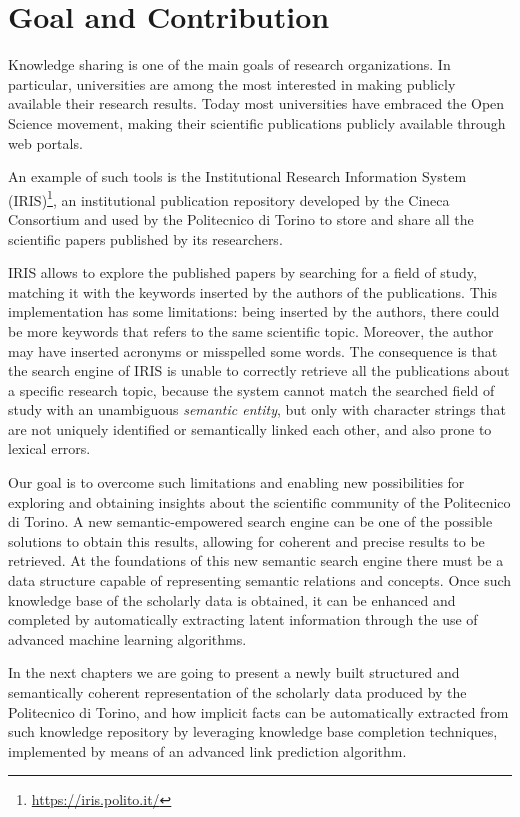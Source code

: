 \documentclass[%
    corpo=13.5pt,
    twoside,
    oldstyle,
    tipotesi=magistrale,
    greek,
    evenboxes
]{toptesi}
\begin{document}
\section{Goal and Contribution}

Knowledge sharing is one of the main goals of research organizations. In
particular, universities are among the most interested in making publicly
available their research results. Today most universities have embraced the Open
Science movement, making their scientific publications publicly available
through web portals.

An example of such tools is the Institutional Research Information
System (IRIS)\footnote{\url{https://iris.polito.it/}}, an
institutional publication repository developed by the Cineca Consortium and
used by the Politecnico di Torino to store and share all the scientific papers
published by its researchers.

IRIS allows to explore the published papers by searching for a field of study,
matching it with the keywords inserted by the authors of the publications.
This implementation has some limitations: being inserted by the authors, there
could be more keywords that refers to the same scientific topic.
Moreover, the author may have inserted acronyms or misspelled some words.
The consequence is that the search engine of IRIS is unable to correctly
retrieve all the publications about a specific research topic, because the
system cannot match the searched field of study with an unambiguous
\emph{semantic entity}, but only with character strings that are not
uniquely identified or semantically linked each other, and also prone to
lexical errors.

Our goal is to overcome such limitations and enabling new possibilities for
exploring and obtaining insights about the scientific community of the
Politecnico di Torino. A new semantic-empowered search engine can be
one of the possible solutions to obtain this results, allowing for coherent and
precise results to be retrieved.
At the foundations of this new semantic search engine there must be a data
structure capable of representing semantic relations and concepts. Once such
knowledge base of the scholarly data is obtained, it can be enhanced and
completed by automatically extracting latent information through the use of
advanced machine learning algorithms.

In the next chapters we are going to present a newly built structured and
semantically coherent representation of the scholarly data produced by the
Politecnico di Torino, and how implicit facts can be automatically
extracted from such knowledge repository by leveraging knowledge base
completion techniques, implemented by means of an advanced link prediction
algorithm.
\end{document}

